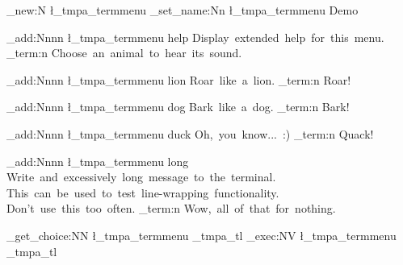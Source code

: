  \relax \ExplSyntaxOn
 \relax %

\termmenu_new:N \l_tmpa_termmenu
\termmenu_set_name:Nn \l_tmpa_termmenu { Demo }
 
\termmenu_add:Nnnn \l_tmpa_termmenu { help }
  { Display~extended~help~for~this~menu. }
  { \msg_term:n { Choose~an~animal~to~hear~its~sound. } }
 
\termmenu_add:Nnnn \l_tmpa_termmenu { lion }
  { Roar~like~a~lion. }
  { \msg_term:n { Roar! } }
 
\termmenu_add:Nnnn \l_tmpa_termmenu { dog }
  { Bark~like~a~dog. }
  { \msg_term:n { Bark! } }
 
\termmenu_add:Nnnn \l_tmpa_termmenu { duck }
  { Oh,~you~know...~:) }
  { \msg_term:n { Quack! } }

\termmenu_add:Nnnn \l_tmpa_termmenu { long }
  {
    Write~and~excessively~long~message~to~the~terminal.~
    This~can~be~used~to~test~line-wrapping~functionality.~
    Don't~use~this~too~often.
  }
  { \msg_term:n { Wow,~all~of~that~for~nothing. } }
 
\termmenu_get_choice:NN \l_tmpa_termmenu \g_tmpa_tl
\termmenu_exec:NV \l_tmpa_termmenu \g_tmpa_tl

\bye
